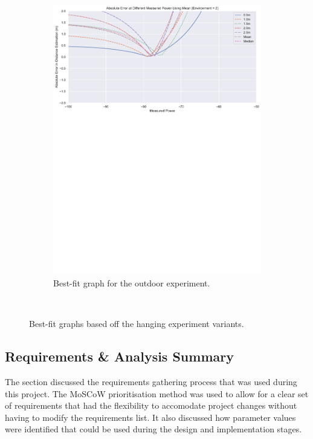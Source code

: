 \documentclass{l4proj}
\begin{document}
\begin{figure}[!htb]
\begin{subfigure}[b]{0.45\textwidth}
        \includegraphics[width=\textwidth]{images/outdoor_hanging_bestfit.pdf}
        \caption{ Best-fit graph for the outdoor experiment. }
        \label{fig:outdoor_hanging_bestfit}
    \end{subfigure}
    ~ %
    \caption{ Best-fit graphs based off the hanging experiment variants. }
    \label{fig:bestfit_plots}
\end{figure}

\subsection{Requirements \& Analysis Summary}

The section discussed the requirements gathering process that was used during this project. The MoSCoW prioritisation method was used to allow for a clear set of requirements that had the flexibility to accomodate project changes without having to modify the requirements list. It also discussed how parameter values were identified that could be used during the design and implementation stages.
\end{document}
